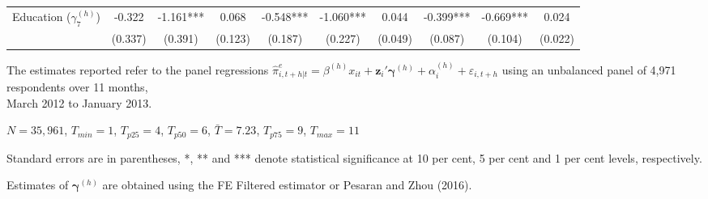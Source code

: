 \begin{table}[!h]
\begin{threeparttable}
\begin{tabular}{|l|ccc|ccc|ccc|}
Education ($\gamma^{(h)}_7$) & -0.322 & -1.161*** & 0.068 & -0.548*** & -1.060*** & 0.044 & -0.399*** & -0.669*** & 0.024 \\ 
 & (0.337) & (0.391) & (0.123)& (0.187) & (0.227) & (0.049)& (0.087) & (0.104) & (0.022) \\ \bottomrule
\end{tabular} 
\begin{tablenotes} 
\item The  estimates reported refer to the panel regressions  $\hat{\pi}^e_{i,t+h|t}=\beta^{(h)} x_{i t}+\mathbf{z}_{i}\prime\mathbf{\gamma }^{(h)}+\alpha_i^{(h)}+\varepsilon_{i,t+h}$  using an unbalanced panel of 4,971 respondents over 11 months,\\  March 2012 to January 2013.
\item $N=35,961$, $T_{min}=1$, $T_{p25}=4$, $T_{p50}=6$, $\bar{T}=7.23$, $T_{p75}=9$,    $T_{max}=11$
\item Standard errors are in parentheses, *, ** and *** denote statistical significance at 10 per cent, 5 per cent and 1 per cent levels, respectively. 
\item Estimates of $\mathbf{\gamma}^{(h)}$ are obtained using the  FE Filtered estimator or Pesaran and Zhou (2016). 
  \end{tablenotes} 
\end{threeparttable} 
\end{table} 
